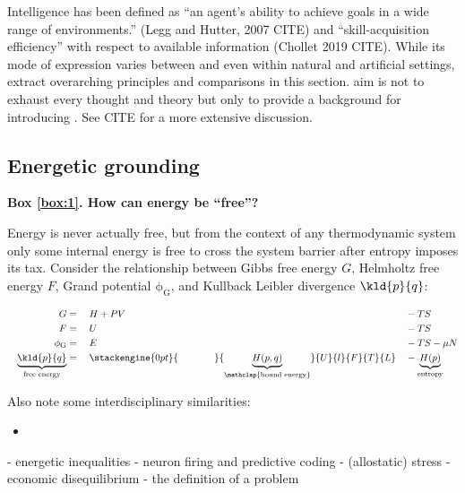 Intelligence has been defined as ``an agent’s ability to achieve goals in a wide range of environments.'' (Legg and Hutter, 2007 CITE) and ``skill-acquisition efficiency'' with respect to available information (Chollet 2019 CITE). While its mode of expression varies between and even within natural and artificial settings, \we extract overarching principles and comparisons in this section. \Our aim is not to exhaust every thought and theory but only to provide a background for introducing \PGI. See CITE for a more extensive discussion.

\subsection{Energetic grounding}

\begin{WrapText}\label{box:1}
\textbf{Box \ref{box:1}. How can energy be ``free''?}

Energy is never actually free, but from the context of any thermodynamic system only some internal energy is free to cross the system barrier after entropy imposes its tax. Consider the relationship between Gibbs free energy $G$, Helmholtz free energy $F$, Grand potential $\mathrm{\phi_{G}}$, and Kullback Leibler divergence $\kld{p}{q}$\citep[2]{Hafner2020}:

\begin{alignat*}{4}
&& G    &{} = {}&& H + PV && - TS \\
&& F    &{} = {}&& U      && - TS \\
&& \mathrm{\phi_{G}} &{} = {}&& E      && - TS - \mu N \\
&& \underbrace{ \kld{p}{q} }_{\text{free energy}} &{} = {}&& \stackengine{0pt}{\phantom{H + PV}}{\underbrace{ H(p,q) }_{\mathclap{\text{bound energy}}} }{U}{l}{F}{T}{L} && - \underbrace{ H(p) }_{\text{entropy}}
\end{alignat*}




Also note some interdisciplinary similarities:
\begin{itemize}
 \item 
\end{itemize}

- energetic inequalities
- neuron firing and predictive coding
- (allostatic) stress
- economic disequilibrium
- the definition of a problem
\end{WrapText}

